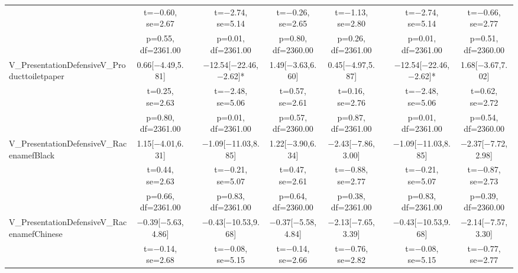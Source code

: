 \documentclass[]{report}
\begin{document}
\begin{table}
{\begin{tabular}[t]{lcccccccc}
		& t=\num{-0.60}, se=\num{2.67} &  & t=\num{-2.74}, se=\num{5.14} & t=\num{-0.26}, se=\num{2.65} & t=\num{-1.13}, se=\num{2.80} &  & t=\num{-2.74}, se=\num{5.14} & t=\num{-0.66}, se=\num{2.77}\\
		& p=\num{0.55}, df=\num{2361.00} &  & p=\num{0.01}, df=\num{2361.00} & p=\num{0.80}, df=\num{2360.00} & p=\num{0.26}, df=\num{2361.00} &  & p=\num{0.01}, df=\num{2361.00} & p=\num{0.51}, df=\num{2360.00}\\
		V\_PresentationDefensiveV\_Producttoiletpaper & \num{0.66}[\num{-4.49},\num{5.81}] &  & \num{-12.54}[\num{-22.46},\num{-2.62}]* & \num{1.49}[\num{-3.63},\num{6.60}] & \num{0.45}[\num{-4.97},\num{5.87}] &  & \num{-12.54}[\num{-22.46},\num{-2.62}]* & \num{1.68}[\num{-3.67},\num{7.02}]\\
		& t=\num{0.25}, se=\num{2.63} &  & t=\num{-2.48}, se=\num{5.06} & t=\num{0.57}, se=\num{2.61} & t=\num{0.16}, se=\num{2.76} &  & t=\num{-2.48}, se=\num{5.06} & t=\num{0.62}, se=\num{2.72}\\
		& p=\num{0.80}, df=\num{2361.00} &  & p=\num{0.01}, df=\num{2361.00} & p=\num{0.57}, df=\num{2360.00} & p=\num{0.87}, df=\num{2361.00} &  & p=\num{0.01}, df=\num{2361.00} & p=\num{0.54}, df=\num{2360.00}\\
		V\_PresentationDefensiveV\_RacenamefBlack & \num{1.15}[\num{-4.01},\num{6.31}] &  & \num{-1.09}[\num{-11.03},\num{8.85}] & \num{1.22}[\num{-3.90},\num{6.34}] & \num{-2.43}[\num{-7.86},\num{3.00}] &  & \num{-1.09}[\num{-11.03},\num{8.85}] & \num{-2.37}[\num{-7.72},\num{2.98}]\\
		& t=\num{0.44}, se=\num{2.63} &  & t=\num{-0.21}, se=\num{5.07} & t=\num{0.47}, se=\num{2.61} & t=\num{-0.88}, se=\num{2.77} &  & t=\num{-0.21}, se=\num{5.07} & t=\num{-0.87}, se=\num{2.73}\\
		& p=\num{0.66}, df=\num{2361.00} &  & p=\num{0.83}, df=\num{2361.00} & p=\num{0.64}, df=\num{2360.00} & p=\num{0.38}, df=\num{2361.00} &  & p=\num{0.83}, df=\num{2361.00} & p=\num{0.39}, df=\num{2360.00}\\
		V\_PresentationDefensiveV\_RacenamefChinese & \num{-0.39}[\num{-5.63},\num{4.86}] &  & \num{-0.43}[\num{-10.53},\num{9.68}] & \num{-0.37}[\num{-5.58},\num{4.84}] & \num{-2.13}[\num{-7.65},\num{3.39}] &  & \num{-0.43}[\num{-10.53},\num{9.68}] & \num{-2.14}[\num{-7.57},\num{3.30}]\\
		& t=\num{-0.14}, se=\num{2.68} &  & t=\num{-0.08}, se=\num{5.15} & t=\num{-0.14}, se=\num{2.66} & t=\num{-0.76}, se=\num{2.82} &  & t=\num{-0.08}, se=\num{5.15} & t=\num{-0.77}, se=\num{2.77}\\

\end{tabular}}
\end{table}
\end{document}
